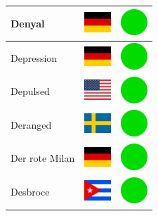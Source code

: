 \documentclass[12pt, a4paper, twoside]{report}
\begin{document}
\begin{center}
\begin{longtable}{|p{5cm}|p{2cm}|p{2cm}|}
Denyal & \includegraphics[width=1cm]{4x3/de} & \includegraphics[width=1cm]{likes/y} \\ \hline
Depression & \includegraphics[width=1cm]{4x3/de} & \includegraphics[width=1cm]{likes/y} \\ \hline
Depulsed & \includegraphics[width=1cm]{4x3/us} & \includegraphics[width=1cm]{likes/y} \\ \hline
Deranged & \includegraphics[width=1cm]{4x3/se} & \includegraphics[width=1cm]{likes/y} \\ \hline
Der rote Milan & \includegraphics[width=1cm]{4x3/de} & \includegraphics[width=1cm]{likes/y} \\ \hline
Desbroce & \includegraphics[width=1cm]{4x3/cu} & \includegraphics[width=1cm]{likes/y} \\ \hline

\end{longtable}
\end{center}
\end{document}
